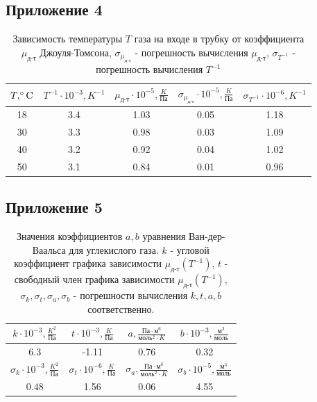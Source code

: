 \subsection{Приложение 4} \label{Приложение 4}
\begin{table}[h]
    \centering
    \begin{tabular}{|c|c|c|c|c|}
    \hline
    $T, \celsius$ & $T^{-1}\cdot 10^{-3}, K^{-1}$ & $\mu_{\text{д-т}}\cdot 10^{-5}, \frac{K}{\text{Па}}$  & $\sigma_{\mu_{\text{д-т}}}\cdot 10^{-5}, \frac{K}{\text{Па}}$ & $\sigma_{T^{-1}}\cdot 10^{-6}, K^{-1}$ \\ \hline
     18  & 3.4  & 1.03   & 0.05 & 1.18  \\ \hline
     30  & 3.3  & 0.98   & 0.03 & 1.09  \\ \hline
     40  & 3.2  & 0.92   & 0.04 & 1.02 \\ \hline
     50  & 3.1  & 0.84   & 0.01 & 0.96 \\ \hline
\end{tabular}
    \caption{Зависимость температуры $T$ газа на входе в трубку от коэффициента $\mu_\text{д-т}$ Джоуля-Томсона, $\sigma_{\mu_{\text{д-т}}}$ - погрешность вычисления $\mu_\text{д-т}$, $\sigma_{T^{-1}}$ - погрешность вычисления $T^{-1}$}
    \label{tab:t1}
\end{table}
\newpage
\subsection{Приложение 5} \label{Приложение 5}
\begin{table}[h]
    \centering
    \begin{tabular}{|c|c|c|c|}
    \hline
    $k \cdot 10^{-3}, \frac{K^2}{\text{Па}}$ & 
    $t\cdot 10^{-3}, \frac{K}{\text{Па}}$ &
    $a, \frac{\text{Па}\cdot \text{м}^6}{\text{моль}^2\cdot K}$  &
    $b\cdot 10^{-3}, \frac{\text{м}^3}{\text{моль}}$ \\ \hline
     6.3  & -1.11  & 0.76   & 0.32 \\ \hline
    $\sigma_k\cdot 10^{-3}, \frac{K^2}{\text{Па}}$ &
    $\sigma_t\cdot 10^{-6}, \frac{K}{\text{Па}}$ &
    $\sigma_a, \frac{\text{Па}\cdot \text{м}^6}{\text{моль}^2\cdot K}$ & $\sigma_b\cdot 10^{-5}, \frac{\text{м}^3}{\text{моль}}$\\ \hline
     0.48 & 1.56 & 0.06 & 4.55  \\ \hline
\end{tabular}
    \caption{Значения коэффициентов $a, b$ уравнения Ван-дер-Ваальса для углекислого газа. $k$ - угловой коэффициент графика зависимости $\mu_\text{д-т}(T^{-1})$, $t$ - свободный член графика зависимости $\mu_\text{д-т}(T^{-1})$, $\sigma_k, \sigma_t, \sigma_a, \sigma_b$ - погрешности вычисления $k, t, a, b$ соответственно.}
    \label{tab:t1}
\end{table}
